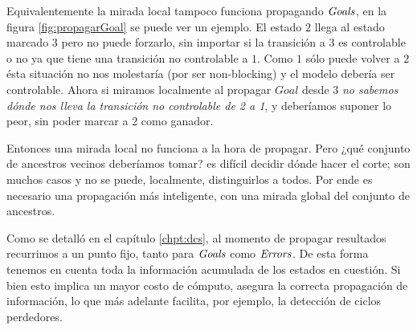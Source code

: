 Equivalentemente la mirada local tampoco funciona propagando $\mathit{Goals}$, en la figura \ref{fig:propagarGoal} se puede ver un ejemplo. El estado $2$ llega al estado marcado $3$ pero no puede forzarlo, sin importar si la transición a $3$ es controlable o no ya que tiene una transición no controlable a $1$. Como $1$ sólo puede volver a $2$ ésta situación no nos molestaría (por ser non-blocking) y el modelo debería ser controlable. Ahora si miramos localmente al propagar $Goal$ desde $3$ \textit{no sabemos dónde nos lleva la transición no controlable de 2 a 1}, y deberíamos suponer lo peor, sin poder marcar a 2 como ganador.

Entonces una mirada local no funciona a la hora de propagar. Pero ¿qué conjunto de ancestros vecinos deberíamos tomar? es difícil decidir dónde hacer el corte; son muchos casos y no se puede, localmente, distinguirlos a todos. Por ende es necesario una propagación más inteligente, con una mirada global del conjunto de ancestros.

Como se detalló en el capítulo \ref{chpt:dcs}, al momento de propagar resultados recurrimos a un punto fijo, tanto para $\mathit{Goals}$ como $\mathit{Errors}$. De esta forma tenemos en cuenta toda la información acumulada de los estados en cuestión. Si bien esto implica un mayor costo de cómputo, asegura la correcta propagación de información, lo que más adelante facilita, por ejemplo, la detección de ciclos perdedores.\\

